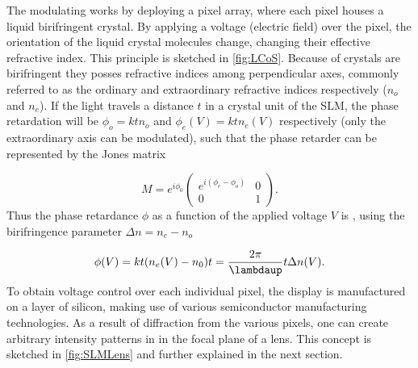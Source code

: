 The modulating works by deploying a pixel array, where each pixel houses a liquid birifringent crystal.
By applying a voltage (electric field) over the pixel, the orientation of the liquid crystal molecules change, changing their effective refractive index.
This principle is sketched in \cref{fig:LCoS}.
Because of crystals are birifringent they posses refractive indices among perpendicular axes, commonly referred to as the ordinary and extraordinary refractive indices respectively ($n_o$ and $n_e$). 
If the light travels a distance $t$ in a crystal unit of the SLM, the phase retardation will be $\phi_o = k t n_o$ and $\phi_e(V) = k t n_e(V)$ respectively (only the extraordinary axis can be modulated), such that the phase retarder can be represented by the Jones matrix \cite{Guzman2017}

\begin{equation}\label{eq:JonesMatrix}
    M = e^{i \phi_0} 
    \begin{pmatrix}
        e^{i(\phi_e-\phi_o)} & 0\\
        0 & 1
    \end{pmatrix}.
\end{equation}
Thus the phase retardance $\phi$ as a function of the applied voltage $V$ is \cite{Guzman2017}, using the birifringence parameter $\Delta n= n_e-n_o$

\begin{equation}\label{eq:ElectroOpticResponse}
    \phi(V) = k t(n_e(V) - n_0) t = \frac{2\pi}{\lambdaup}t \Delta n(V).
\end{equation}
To obtain voltage control over each individual pixel, the display is manufactured on a layer of silicon, making use of various semiconductor manufacturing technologies.
As a result of diffraction from the various pixels, one can create arbitrary intensity patterns in in the focal plane of a lens.
This concept is sketched in \cref{fig:SLMLens} and further explained in the next section.


